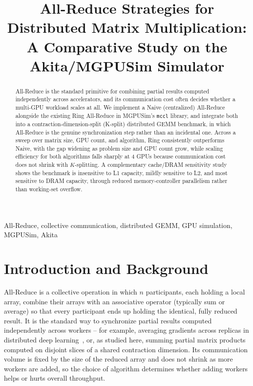 \documentclass[conference]{IEEEtran}
\begin{document}
\title{All-Reduce Strategies for Distributed Matrix Multiplication:\\
A Comparative Study on the Akita/MGPUSim Simulator}

\author{
}

\maketitle

\begin{abstract}
All-Reduce is the standard primitive for combining partial results computed independently across accelerators, and its communication cost often decides whether a multi-GPU workload scales at all. We implement a Naive (centralized) All-Reduce alongside the existing Ring All-Reduce in MGPUSim's \texttt{mccl} library, and integrate both into a contraction-dimension-split (K-split) distributed GEMM benchmark, in which All-Reduce is the genuine synchronization step rather than an incidental one. Across a sweep over matrix size, GPU count, and algorithm, Ring consistently outperforms Naive, with the gap widening as problem size and GPU count grow, while scaling efficiency for both algorithms falls sharply at 4 GPUs because communication cost does not shrink with $K$-splitting. A complementary cache/DRAM sensitivity study shows the benchmark is insensitive to L1 capacity, mildly sensitive to L2, and most sensitive to DRAM capacity, through reduced memory-controller parallelism rather than working-set overflow.
\end{abstract}

\begin{IEEEkeywords}
All-Reduce, collective communication, distributed GEMM, GPU simulation, MGPUSim, Akita
\end{IEEEkeywords}

\section{Introduction and Background}
\label{sec:intro}

All-Reduce is a collective operation in which $n$ participants, each holding a local array, combine their arrays with an associative operator (typically sum or average) so that every participant ends up holding the identical, fully reduced result. It is the standard way to synchronize partial results computed independently across workers -- for example, averaging gradients across replicas in distributed deep learning~\cite{patarasuk2009}, or, as studied here, summing partial matrix products computed on disjoint slices of a shared contraction dimension. Its communication volume is fixed by the size of the reduced array and does not shrink as more workers are added, so the choice of algorithm determines whether adding workers helps or hurts overall throughput.
\end{document}
